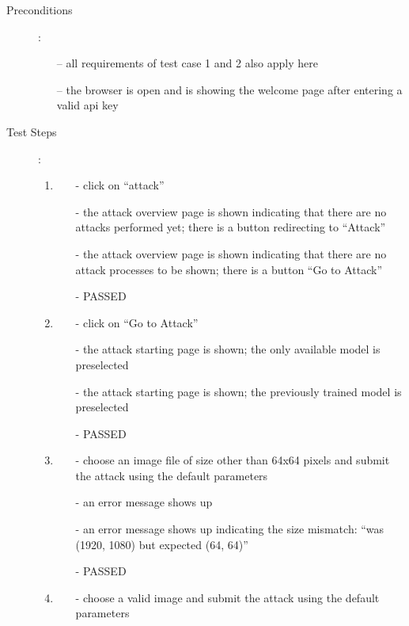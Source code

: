 \begin{description}
	\item[Preconditions]: 
	\begin{itemize}
		\item [--] all requirements of test case 1 and 2 also apply here
		\item [--] the browser is open and is showing the welcome page after entering a valid api key
	\end{itemize}
	\item[Test Steps]: 
	\begin{enumerate}
		\item  
		\begin{itemize}
			\item [-] click on \enquote{attack}
			\item [-] the attack overview page is shown indicating that there are no attacks performed yet; there is a button redirecting to \enquote{Attack}
			\item [-] the attack overview page is shown indicating that there are no attack processes to be shown; there is a button \enquote{Go to Attack}
			\item [-] PASSED
		\end{itemize}
		\item  
		\begin{itemize}
			\item [-] click on \enquote{Go to Attack}
			\item [-] the attack starting page is shown; the only available model is preselected
			\item [-] the attack starting page is shown; the previously trained model is preselected
			\item [-] PASSED
		\end{itemize}
		\item  
		\begin{itemize}
			\item [-] choose an image file of size other than 64x64 pixels and submit the attack using the default parameters
			\item [-] an error message shows up
			\item [-] an error message shows up indicating the size mismatch: \enquote{was (1920, 1080) but expected (64, 64)}
			\item [-] PASSED
		\end{itemize}
		\item  
		\begin{itemize}
			\item [-] choose a valid image and submit the attack using the default parameters

\end{itemize}
\end{enumerate}
\end{description}

